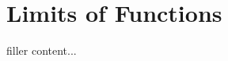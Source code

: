 \documentclass[../../templates/section]{subfiles}
\begin{document}
\section{Limits of Functions}\label{sec:limits-of-functions}

filler content...
\end{document}
